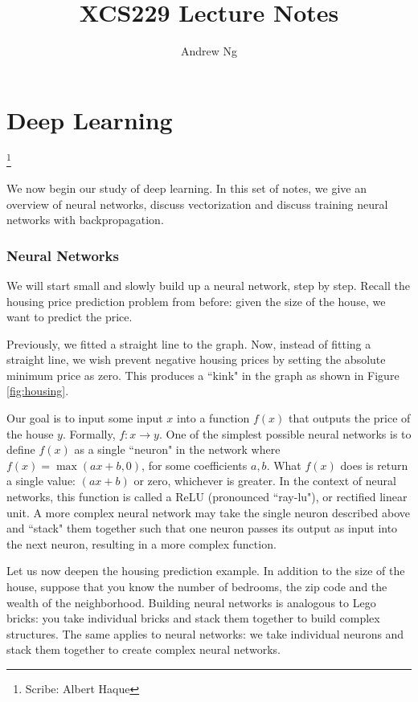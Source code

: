 \documentclass{article}
\numberwithin{equation}{section}
\newcommand\blfootnote[1]{%
	\begingroup
	\renewcommand\thefootnote{}\footnote{#1}%
	\addtocounter{footnote}{-1}%
	\endgroup
}
\begin{document}
\title{XCS229 Lecture Notes}
\author{Andrew Ng}
\date{}
\maketitle

\part*{Deep Learning}\blfootnote{Scribe: Albert Haque}

\noindent We now begin our study of deep learning. In this set of notes, we give an overview of neural networks, discuss vectorization and discuss training neural networks with backpropagation. 

\section{Neural Networks}

We will start small and slowly build up a neural network, step by step. Recall the housing price prediction problem from before: given the size of the house, we want to predict the price.

Previously, we fitted a straight line to the graph. Now, instead of fitting a straight line, we wish prevent negative housing prices by setting the absolute minimum price as zero. This produces a ``kink" in the graph as shown in Figure \ref{fig:housing}.

Our goal is to input some input $x$ into a function $f(x)$ that outputs the price of the house $y$. Formally, $f: x \rightarrow y$. One of the simplest possible neural networks is to define $f(x)$ as a single ``neuron" in the network where $f(x) = \max(ax + b, 0)$, for some coefficients $a,b$. What $f(x)$ does is return a single value: $(ax + b)$ or zero, whichever is greater. In the context of neural networks, this function is called a ReLU (pronounced ``ray-lu"), or rectified linear unit.  A more complex neural network may take the single neuron described above and ``stack" them together such that one neuron passes its output as input into the next neuron, resulting in a more complex function.

Let us now deepen the housing prediction example. In addition to the size of the house, suppose that you know the number of bedrooms, the zip code and the wealth of the neighborhood. Building neural networks is analogous to Lego bricks: you take individual bricks and stack them together to build complex structures. The same applies to neural networks: we take individual neurons and stack them together to create complex neural networks.
\end{document}
